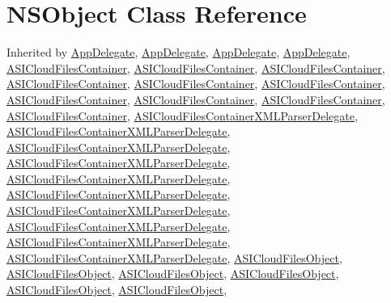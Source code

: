 \hypertarget{class_n_s_object}{
\section{\-N\-S\-Object \-Class \-Reference}
\label{class_n_s_object}
}


\-Inherited by \hyperlink{interface_app_delegate}{\-App\-Delegate}, \hyperlink{interface_app_delegate}{\-App\-Delegate}, \hyperlink{interface_app_delegate}{\-App\-Delegate}, \hyperlink{interface_app_delegate}{\-App\-Delegate}, \hyperlink{interface_a_s_i_cloud_files_container}{\-A\-S\-I\-Cloud\-Files\-Container}, \hyperlink{interface_a_s_i_cloud_files_container}{\-A\-S\-I\-Cloud\-Files\-Container}, \hyperlink{interface_a_s_i_cloud_files_container}{\-A\-S\-I\-Cloud\-Files\-Container}, \hyperlink{interface_a_s_i_cloud_files_container}{\-A\-S\-I\-Cloud\-Files\-Container}, \hyperlink{interface_a_s_i_cloud_files_container}{\-A\-S\-I\-Cloud\-Files\-Container}, \hyperlink{interface_a_s_i_cloud_files_container}{\-A\-S\-I\-Cloud\-Files\-Container}, \hyperlink{interface_a_s_i_cloud_files_container}{\-A\-S\-I\-Cloud\-Files\-Container}, \hyperlink{interface_a_s_i_cloud_files_container}{\-A\-S\-I\-Cloud\-Files\-Container}, \hyperlink{interface_a_s_i_cloud_files_container}{\-A\-S\-I\-Cloud\-Files\-Container}, \hyperlink{interface_a_s_i_cloud_files_container}{\-A\-S\-I\-Cloud\-Files\-Container}, \hyperlink{interface_a_s_i_cloud_files_container_x_m_l_parser_delegate}{\-A\-S\-I\-Cloud\-Files\-Container\-X\-M\-L\-Parser\-Delegate}, \hyperlink{interface_a_s_i_cloud_files_container_x_m_l_parser_delegate}{\-A\-S\-I\-Cloud\-Files\-Container\-X\-M\-L\-Parser\-Delegate}, \hyperlink{interface_a_s_i_cloud_files_container_x_m_l_parser_delegate}{\-A\-S\-I\-Cloud\-Files\-Container\-X\-M\-L\-Parser\-Delegate}, \hyperlink{interface_a_s_i_cloud_files_container_x_m_l_parser_delegate}{\-A\-S\-I\-Cloud\-Files\-Container\-X\-M\-L\-Parser\-Delegate}, \hyperlink{interface_a_s_i_cloud_files_container_x_m_l_parser_delegate}{\-A\-S\-I\-Cloud\-Files\-Container\-X\-M\-L\-Parser\-Delegate}, \hyperlink{interface_a_s_i_cloud_files_container_x_m_l_parser_delegate}{\-A\-S\-I\-Cloud\-Files\-Container\-X\-M\-L\-Parser\-Delegate}, \hyperlink{interface_a_s_i_cloud_files_container_x_m_l_parser_delegate}{\-A\-S\-I\-Cloud\-Files\-Container\-X\-M\-L\-Parser\-Delegate}, \hyperlink{interface_a_s_i_cloud_files_container_x_m_l_parser_delegate}{\-A\-S\-I\-Cloud\-Files\-Container\-X\-M\-L\-Parser\-Delegate}, \hyperlink{interface_a_s_i_cloud_files_container_x_m_l_parser_delegate}{\-A\-S\-I\-Cloud\-Files\-Container\-X\-M\-L\-Parser\-Delegate}, \hyperlink{interface_a_s_i_cloud_files_container_x_m_l_parser_delegate}{\-A\-S\-I\-Cloud\-Files\-Container\-X\-M\-L\-Parser\-Delegate}, \hyperlink{interface_a_s_i_cloud_files_object}{\-A\-S\-I\-Cloud\-Files\-Object}, \hyperlink{interface_a_s_i_cloud_files_object}{\-A\-S\-I\-Cloud\-Files\-Object}, \hyperlink{interface_a_s_i_cloud_files_object}{\-A\-S\-I\-Cloud\-Files\-Object}, \hyperlink{interface_a_s_i_cloud_files_object}{\-A\-S\-I\-Cloud\-Files\-Object}, \hyperlink{interface_a_s_i_cloud_files_object}{\-A\-S\-I\-Cloud\-Files\-Object}, \hyperlink{interface_a_s_i_cloud_files_object}{\-A\-S\-I\-Cloud\-Files\-Object}, 